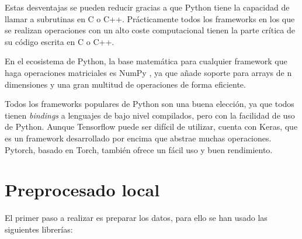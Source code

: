 Estas desventajas se pueden reducir gracias a que Python tiene la capacidad de llamar a subrutinas en C o C++. Prácticamente todos los frameworks en los que se realizan operaciones con un alto coste computacional tienen la parte crítica de su código escrita en C o C++.

En el ecosistema de Python, la base matemática para cualquier framework que haga operaciones matriciales es NumPy \cite{VanDerWalt2011}, ya que añade soporte para arrays de n dimensiones y una gran multitud de operaciones de forma eficiente.

Todos los frameworks populares de Python son una buena elección, ya que todos tienen \textit{bindings} a lenguajes de bajo nivel compilados, pero con la facilidad de uso de Python. Aunque Tensorflow puede ser difícil de utilizar, cuenta con Keras, que es un framework desarrollado por encima que abstrae muchas operaciones. Pytorch, basado en Torch, también ofrece un fácil uso y buen rendimiento.

\section{Preprocesado local}\label{sec:local_preprocessing}

El primer paso a realizar es preparar los datos, para ello se han usado las siguientes librerías:

